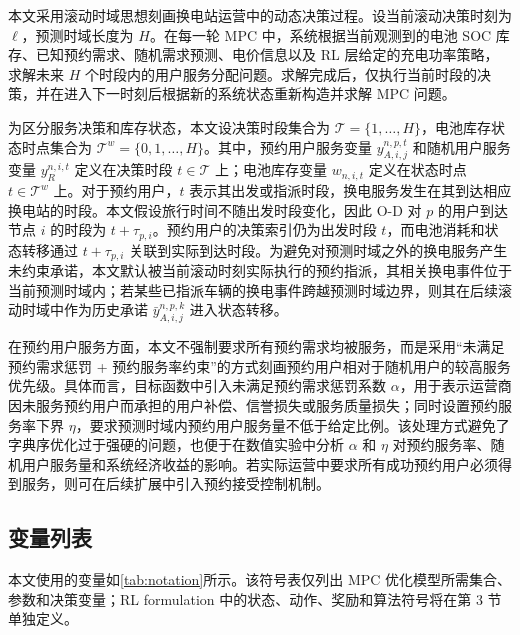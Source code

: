 \documentclass[12pt,hyperref,a4paper,UTF8]{ctexart}
\begin{document}
本文采用滚动时域思想刻画换电站运营中的动态决策过程。设当前滚动决策时刻为 $\ell$，预测时域长度为 $H$。在每一轮 MPC 中，系统根据当前观测到的电池 SOC 库存、已知预约需求、随机需求预测、电价信息以及 RL 层给定的充电功率策略，求解未来 $H$ 个时段内的用户服务分配问题。求解完成后，仅执行当前时段的决策，并在进入下一时刻后根据新的系统状态重新构造并求解 MPC 问题。

为区分服务决策和库存状态，本文设决策时段集合为 $\mathcal{T}=\{1,\ldots,H\}$，电池库存状态时点集合为 $\mathcal{T}^{w}=\{0,1,\ldots,H\}$。其中，预约用户服务变量 $y_{A,i,j}^{n,p,t}$ 和随机用户服务变量 $y_R^{n,i,t}$ 定义在决策时段 $t\in\mathcal{T}$ 上；电池库存变量 $w_{n,i,t}$ 定义在状态时点 $t\in\mathcal{T}^{w}$ 上。对于预约用户，$t$ 表示其出发或指派时段，换电服务发生在其到达相应换电站的时段。本文假设旅行时间不随出发时段变化，因此 O-D 对 $p$ 的用户到达节点 $i$ 的时段为 $t+\tau_{p,i}$。预约用户的决策索引仍为出发时段 $t$，而电池消耗和状态转移通过 $t+\tau_{p,i}$ 关联到实际到达时段。为避免对预测时域之外的换电服务产生未约束承诺，本文默认被当前滚动时刻实际执行的预约指派，其相关换电事件位于当前预测时域内；若某些已指派车辆的换电事件跨越预测时域边界，则其在后续滚动时域中作为历史承诺 $\bar{y}_{A,i,j}^{n,p,k}$ 进入状态转移。

在预约用户服务方面，本文不强制要求所有预约需求均被服务，而是采用“未满足预约需求惩罚 + 预约服务率约束”的方式刻画预约用户相对于随机用户的较高服务优先级。具体而言，目标函数中引入未满足预约需求惩罚系数 $\alpha$，用于表示运营商因未服务预约用户而承担的用户补偿、信誉损失或服务质量损失；同时设置预约服务率下界 $\eta$，要求预测时域内预约用户服务量不低于给定比例。该处理方式避免了字典序优化过于强硬的问题，也便于在数值实验中分析 $\alpha$ 和 $\eta$ 对预约服务率、随机用户服务量和系统经济收益的影响。若实际运营中要求所有成功预约用户必须得到服务，则可在后续扩展中引入预约接受控制机制。

\subsection{变量列表}

本文使用的变量如\autoref{tab:notation}所示。该符号表仅列出 MPC 优化模型所需集合、参数和决策变量；RL formulation 中的状态、动作、奖励和算法符号将在第 3 节单独定义。
\end{document}

